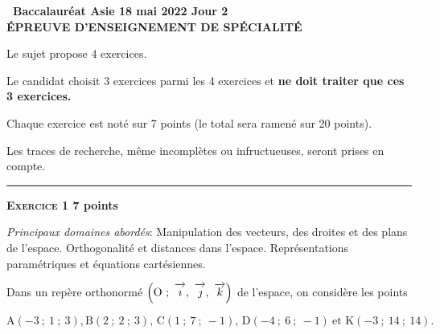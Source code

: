 \documentclass[11pt]{article}
\newcommand{\vect}[1]{\overrightarrow{\,\mathstrut#1\,}}
\def\Oijk{$\left(\text{O}~;~\vect{\imath},~\vect{\jmath},~\vect{k}\right)$}
\begin{document}
\setlength\parindent{0mm}
\pagestyle{fancy}
\thispagestyle{empty}

\begin{center}{\Large\textbf{\decofourleft~Baccalauréat Asie 18 mai 2022 Jour 2~\decofourright\\[6pt] ÉPREUVE D'ENSEIGNEMENT DE SPÉCIALITÉ}}

\vspace{0,25cm}

Le sujet propose 4 exercices.

Le candidat choisit 3 exercices parmi les 4 exercices et \textbf{ne doit traiter que ces 3 exercices.}

\medskip

Chaque exercice est noté sur 7 points (le total sera ramené sur 20 points). 

\medskip

Les traces de recherche, même incomplètes ou infructueuses, seront prises en compte.

\hrule
\end{center}

\bigskip

\textbf{\textsc{Exercice 1} \hfill 7 points}

\medskip

\emph{Principaux domaines abordés}: Manipulation des vecteurs, des droites et des plans de l'espace. Orthogonalité et distances dans l'espace.
Représentations paramétriques et équations cartésiennes.

\bigskip

Dans un repère orthonormé \Oijk{} de l'espace,
on considère les points 

\[\text{A}(-3~;~1~;~3), \text{B}(2~;~2~;~3),\, \text{C}(1~;~7~;~-1), \,\text{D}(-4~;~6~;~-1)\: \text{et 
K}(-3~;~14~;~14).\]

\medskip
\end{document}
